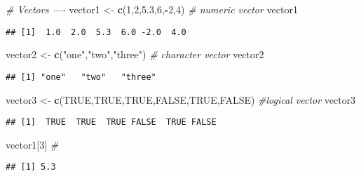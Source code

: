 \documentclass[]{article}
\newenvironment{Shaded}{\begin{snugshade}}{\end{snugshade}}
\newcommand{\CommentTok}[1]{\textcolor[rgb]{0.56,0.35,0.01}{\textit{#1}}}
\newcommand{\DecValTok}[1]{\textcolor[rgb]{0.00,0.00,0.81}{#1}}
\newcommand{\FloatTok}[1]{\textcolor[rgb]{0.00,0.00,0.81}{#1}}
\newcommand{\KeywordTok}[1]{\textcolor[rgb]{0.13,0.29,0.53}{\textbf{#1}}}
\newcommand{\NormalTok}[1]{#1}
\newcommand{\OperatorTok}[1]{\textcolor[rgb]{0.81,0.36,0.00}{\textbf{#1}}}
\newcommand{\OtherTok}[1]{\textcolor[rgb]{0.56,0.35,0.01}{#1}}
\newcommand{\StringTok}[1]{\textcolor[rgb]{0.31,0.60,0.02}{#1}}
\begin{document}
\begin{Shaded}
\begin{Highlighting}[]
\CommentTok{# Vectors ----}
\NormalTok{vector1 <-}\StringTok{ }\KeywordTok{c}\NormalTok{(}\DecValTok{1}\NormalTok{,}\DecValTok{2}\NormalTok{,}\FloatTok{5.3}\NormalTok{,}\DecValTok{6}\NormalTok{,}\OperatorTok{-}\DecValTok{2}\NormalTok{,}\DecValTok{4}\NormalTok{) }\CommentTok{# numeric vector}
\NormalTok{vector1}
\end{Highlighting}
\end{Shaded}

\begin{verbatim}
## [1]  1.0  2.0  5.3  6.0 -2.0  4.0
\end{verbatim}

\begin{Shaded}
\begin{Highlighting}[]
\NormalTok{vector2 <-}\StringTok{ }\KeywordTok{c}\NormalTok{(}\StringTok{"one"}\NormalTok{,}\StringTok{"two"}\NormalTok{,}\StringTok{"three"}\NormalTok{) }\CommentTok{# character vector}
\NormalTok{vector2}
\end{Highlighting}
\end{Shaded}

\begin{verbatim}
## [1] "one"   "two"   "three"
\end{verbatim}

\begin{Shaded}
\begin{Highlighting}[]
\NormalTok{vector3 <-}\StringTok{ }\KeywordTok{c}\NormalTok{(}\OtherTok{TRUE}\NormalTok{,}\OtherTok{TRUE}\NormalTok{,}\OtherTok{TRUE}\NormalTok{,}\OtherTok{FALSE}\NormalTok{,}\OtherTok{TRUE}\NormalTok{,}\OtherTok{FALSE}\NormalTok{) }\CommentTok{#logical vector}
\NormalTok{vector3}
\end{Highlighting}
\end{Shaded}

\begin{verbatim}
## [1]  TRUE  TRUE  TRUE FALSE  TRUE FALSE
\end{verbatim}

\begin{Shaded}
\begin{Highlighting}[]
\NormalTok{vector1[}\DecValTok{3}\NormalTok{] }\CommentTok{# }
\end{Highlighting}
\end{Shaded}

\begin{verbatim}
## [1] 5.3
\end{verbatim}
\end{document}
